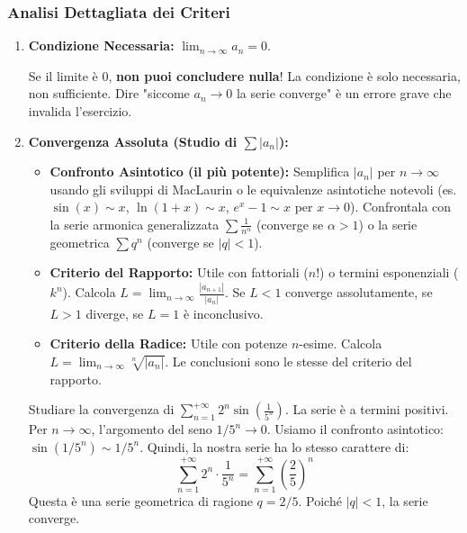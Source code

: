 \documentclass[a4paper, 12pt]{article}
\begin{document}
\subsubsection{Analisi Dettagliata dei Criteri}
\begin{enumerate}
    \item \textbf{Condizione Necessaria:} $\lim_{n \to \infty} a_n = 0$. 
    \begin{errore}
    Se il limite è 0, \textbf{non puoi concludere nulla}! La condizione è solo necessaria, non sufficiente. Dire "siccome $a_n \to 0$ la serie converge" è un errore grave che invalida l'esercizio. 
    \end{errore}

    \item \textbf{Convergenza Assoluta (Studio di \texorpdfstring{$\sum |a_n|$}{|an|}):} 
    \begin{itemize}
        \item \textbf{Confronto Asintotico (il più potente):} Semplifica $|a_n|$ per $n \to \infty$ usando gli sviluppi di MacLaurin o le equivalenze asintotiche notevoli (es. $\sin(x) \sim x$, $\ln(1+x) \sim x$, $e^x-1 \sim x$ per $x \to 0$). Confrontala con la serie armonica generalizzata $\sum \frac{1}{n^\alpha}$ (converge se $\alpha > 1$) o la serie geometrica $\sum q^n$ (converge se $|q| < 1$). 
        \item \textbf{Criterio del Rapporto:} Utile con fattoriali ($n!$) o termini esponenziali ($k^n$). Calcola $L = \lim_{n \to \infty} \frac{|a_{n+1}|}{|a_n|}$. Se $L<1$ converge assolutamente, se $L>1$ diverge, se $L=1$ è inconclusivo. 
        \item \textbf{Criterio della Radice:} Utile con potenze $n$-esime. Calcola $L = \lim_{n \to \infty} \sqrt[n]{|a_n|}$. Le conclusioni sono le stesse del criterio del rapporto. 
    \end{itemize}
    
    \begin{esempio}
    Studiare la convergenza di $\sum_{n=1}^{+\infty} 2^n \sin\left(\frac{1}{5^n}\right)$.
    La serie è a termini positivi. Per $n \to \infty$, l'argomento del seno $1/5^n \to 0$. Usiamo il confronto asintotico: $\sin(1/5^n) \sim 1/5^n$. 
    Quindi, la nostra serie ha lo stesso carattere di:
    \[ \sum_{n=1}^{+\infty} 2^n \cdot \frac{1}{5^n} = \sum_{n=1}^{+\infty} \left(\frac{2}{5}\right)^n \]
    Questa è una serie geometrica di ragione $q=2/5$.  Poiché $|q|<1$, la serie converge. 
    \end{esempio}



\end{enumerate}
\end{document}
